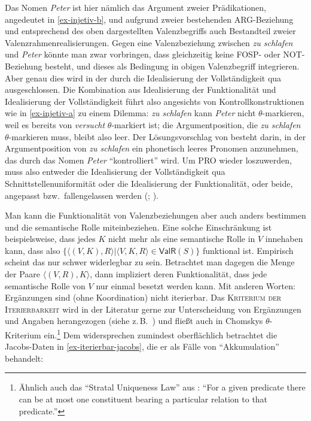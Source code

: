 Das Nomen {\it Peter} ist hier nämlich das Argument zweier Prädikationen, angedeutet in \ref{ex-injetiv-b}, und aufgrund zweier bestehenden ARG-Beziehung und entsprechend des oben dargestellten Valenzbegriffs auch Bestandteil zweier Valenzrahmenrealisierungen. Gegen eine Valenzbeziehung zwischen {\it zu schlafen} und {\it Peter} könnte man zwar vorbringen, dass gleichzeitig keine FOSP- oder NOT-Beziehung besteht, und dieses als Bedingung in obigen Valenzbegriff integrieren. Aber genau dies wird in der  durch die Idealisierung der Vollständigkeit qua  ausgeschlossen. Die Kombination aus Idealisierung der Funktionalität und Idealisierung der Vollständigkeit führt also angesichts von Kontrollkonstruktionen wie in \ref{ex-injetiv-a} zu einem Dilemma: {\it zu schlafen} kann {\it Peter} nicht $\theta$-markieren, weil es bereits von {\it versucht} $\theta$-markiert ist; die Argumentposition, die {\it zu schlafen} $\theta$-markieren muss, bleibt also leer. Der Lösungsvorschlag von \cite{Chomsky:81} besteht darin, in der Argumentposition von {\it zu schlafen} ein phonetisch leeres Pronomen  anzunehmen, das durch das Nomen {\it Peter} "`kontrolliert"' wird. Um PRO wieder loszuwerden, muss also entweder die Idealisierung der Vollständigkeit qua Schnittstellenuniformität oder die Idealisierung der Funktionalität, oder beide, angepasst bzw.\ fallengelassen werden (\citealt{Culicover:Wilkins:86}; \citealt[46, \S3.1.1]{Culicover:Jackendoff:06}). 

Man kann die Funktionalität von Valenzbeziehungen aber auch anders bestimmen und die semantische Rolle miteinbeziehen. Eine solche Einschränkung ist beispielsweise, dass jedes $K$ nicht mehr als eine semantische Rolle in $V$ innehaben kann, dass also $\{\langle (V,K), R \rangle | \langle V,K,R \rangle \in \mathsf{ValR}(S) \}$ funktional ist. Empirisch scheint das nur schwer widerlegbar zu sein. Betrachtet man dagegen die Menge der Paare $\langle (V,R),K \rangle$, dann impliziert deren Funktionalität, dass jede semantische Rolle von $V$ nur einmal besetzt werden kann. Mit anderen Worten: Ergänzungen sind (ohne Koordination) nicht iterierbar. Das \textsc{Kriterium der Iterierbarkeit} wird in der Literatur gerne zur Unterscheidung von Ergänzungen und Angaben herangezogen (siehe z.\,B.\ \citealt[22f]{Mueller:10}) und flie\ss t auch in Chomskys $\theta$-Kriterium ein.\footnote{Ähnlich auch das  "`Stratal Uniqueness Law"' aus \citet[255]{Kracht:02}: "`For a given predicate there can be at most one constituent bearing a particular relation to that predicate."'} Dem widersprechen zumindest oberflächlich betrachtet die Jacobs-Daten in \ref{ex-iterierbar-jacobs}, die er als Fälle von "`Akkumulation"' behandelt:

